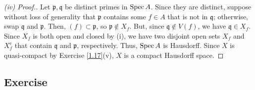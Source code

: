 \begin{proof}[(iv) Proof.]
Let $\mathfrak{p},\mathfrak{q}$ be distinct primes in $\operatorname{Spec} A$. Since they are distinct, suppose without loss of generality that $\mathfrak{p}$ contains some $f \in A$ that is not in $\mathfrak{q}$; otherwise, swap $\mathfrak{q}$
and $\mathfrak{p}$. Then, $(f) \subset \mathfrak{p}$, so $\mathfrak{p} \not\in X_f$. But, since $\mathfrak{q} \not\in V(f)$, we have $\mathfrak{q} \in X_f$. Since $X_f$ is both open and closed by (i), we have two disjoint open 
sets $X_f$ and $X_f^c$ that contain $\mathfrak{q}$ and $\mathfrak{p}$, respectively. Thus, $\operatorname{Spec} A$ is Hausdorff. Since $X$ is quasi-compact by Exercise \ref{1.17}(v), $X$ is a compact Hausdorff space. 
\end{proof}

\subsection{Exercise}\label{1.24}

